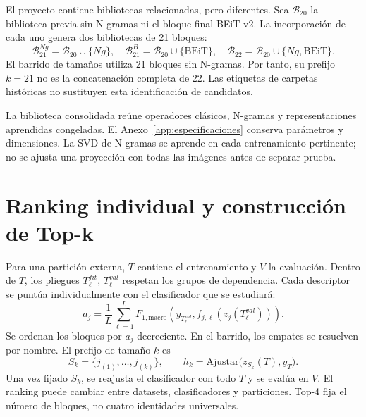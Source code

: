 El proyecto contiene bibliotecas relacionadas, pero diferentes. Sea \(\mathcal B_{20}\) la biblioteca previa sin N-gramas ni el bloque final BEiT-v2. La incorporación de cada uno genera dos bibliotecas de 21 bloques:
\begin{equation}
\mathcal B_{21}^{Ng}=\mathcal B_{20}\cup\{Ng\},\quad
\mathcal B_{21}^{B}=\mathcal B_{20}\cup\{\mathrm{BEiT}\},\quad
\mathcal B_{22}=\mathcal B_{20}\cup\{Ng,\mathrm{BEiT}\}.
\label{eq:tk-libraries}
\end{equation}
El barrido de tamaños utiliza 21 bloques sin N-gramas. Por tanto, su prefijo \(k=21\) no es la concatenación completa de 22. Las etiquetas de carpetas históricas no sustituyen esta identificación de candidatos.

La biblioteca consolidada reúne operadores clásicos, N-gramas y representaciones aprendidas congeladas. El Anexo~\ref{app:especificaciones} conserva parámetros y dimensiones. La SVD de N-gramas se aprende en cada entrenamiento pertinente; no se ajusta una proyección con todas las imágenes antes de separar prueba.

\section{Ranking individual y construcción de Top-k}
Para una partición externa, \(T\) contiene el entrenamiento y \(V\) la evaluación. Dentro de \(T\), los pliegues \(T_\ell^{fit}\), \(T_\ell^{val}\) respetan los grupos de dependencia. Cada descriptor se puntúa individualmente con el clasificador que se estudiará:
\begin{equation}
a_j=\frac{1}{L}\sum_{\ell=1}^{L}
 F_{1,\mathrm{macro}}\!\left(y_{T_\ell^{val}},
 f_{j,\ell}(z_j(T_\ell^{val}))\right).
\label{eq:tk-ranking}
\end{equation}
Se ordenan los bloques por \(a_j\) decreciente. En el barrido, los empates se resuelven por nombre. El prefijo de tamaño \(k\) es
\begin{equation}
S_k=\{j_{(1)},\ldots,j_{(k)}\},\qquad
h_k=\mathrm{Ajustar}\bigl(z_{S_k}(T),y_T\bigr).
\label{eq:tk-subset}
\end{equation}
Una vez fijado \(S_k\), se reajusta el clasificador con todo \(T\) y se evalúa en \(V\). El ranking puede cambiar entre datasets, clasificadores y particiones. Top-4 fija el número de bloques, no cuatro identidades universales.

